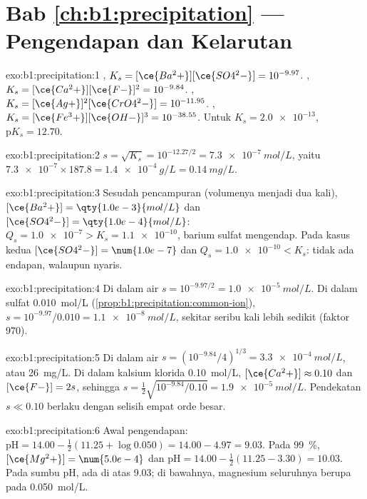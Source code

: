 \section*{Bab \ref{ch:b1:precipitation} --- Pengendapan dan Kelarutan}

\begin{solution}{exo:b1:precipitation:1}
, $K_s = [\ce{Ba^2+}][\ce{SO4^2-}] =
10^{-9.97}$. , $K_s = [\ce{Ca^2+}][\ce{F-}]^2 =
10^{-9.84}$. , $K_s =
[\ce{Ag+}]^2[\ce{CrO4^2-}] = 10^{-11.95}$. ,
$K_s = [\ce{Fe^3+}][\ce{OH-}]^3 = 10^{-38.55}$. Untuk $K_s = \num{2.0e-13}$,
$\mathrm{p}K_s = 12.70$.
\end{solution}

\begin{solution}{exo:b1:precipitation:2}
$s = \sqrt{K_s} = 10^{-12.27/2} = \qty{7.3e-7}{mol/L}$, yaitu
$\num{7.3e-7} \times 187.8 = \qty{1.4e-4}{g/L} = \qty{0.14}{mg/L}$.
\end{solution}

\begin{solution}{exo:b1:precipitation:3}
Sesudah pencampuran (volumenya menjadi dua kali), $[\ce{Ba^2+}] = \qty{1.0e-3}{mol/L}$ dan
$[\ce{SO4^2-}] = \qty{1.0e-4}{mol/L}$: $Q_s = \num{1.0e-7} > K_s =
\num{1.1e-10}$, barium sulfat mengendap. Pada kasus kedua
$[\ce{SO4^2-}] = \num{1.0e-7}$ dan $Q_s = \num{1.0e-10} < K_s$: tidak ada
endapan, walaupun nyaris.
\end{solution}

\begin{solution}{exo:b1:precipitation:4}
Di dalam air $s = 10^{-9.97/2} = \qty{1.0e-5}{mol/L}$. Di dalam sulfat
\qty{0.010}{mol/L} (\cref{prop:b1:precipitation:common-ion}), $s = 10^{-9.97}/0.010 =
\qty{1.1e-8}{mol/L}$, sekitar seribu kali lebih sedikit (faktor 970).
\end{solution}

\begin{solution}{exo:b1:precipitation:5}
Di dalam air $s = (10^{-9.84}/4)^{1/3} = \qty{3.3e-4}{mol/L}$, atau
\qty{26}{mg/L}. Di dalam kalsium klorida \qty{0.10}{mol/L},
$[\ce{Ca^2+}] \approx 0.10$ dan $[\ce{F-}] = 2s$, sehingga
$s = \frac12\sqrt{10^{-9.84}/0.10} = \qty{1.9e-5}{mol/L}$. Pendekatan
$s \ll 0.10$ berlaku dengan selisih empat orde besar.
\end{solution}

\begin{solution}{exo:b1:precipitation:6}
Awal pengendapan: $\mathrm{pH} = 14.00 - \frac12(11.25 + \log 0.050) = 14.00 - 4.97 =
9.03$. Pada \qty{99}{\percent}, $[\ce{Mg^2+}] = \num{5.0e-4}$ dan
$\mathrm{pH} = 14.00 - \frac12(11.25 - 3.30) = 10.03$. Pada sumbu pH,
 ada di atas 9.03; di bawahnya, magnesium seluruhnya berupa
 pada \qty{0.050}{mol/L}.
\end{solution}

